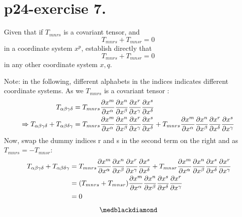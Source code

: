 \section{p24-exercise 7.}
\begin{tcolorbox}
Given that if $T_{mnrs}$ is a covariant tensor, and 
$$ T_{mnrs}+T_{mnsr} = 0$$ in a coordinate system $x^{p}$, establish directly that $$ T^{,}_{mnrs}+T^{,}_{mnsr} = 0$$ in any other coordinate system $x{,q}$.
\end{tcolorbox}
Note: in the following, different alphabets in the indices indicates different coordinate systems.
As we $T_{mnrs}$ is a covariant tensor :
\begin{align}
\ T_{\alpha\beta\gamma\delta} &=  T_{mnrs}\pdv{x^{m}}{x^{\alpha}}\pdv{x^{n}}{x^{\beta}}\pdv{x^{r}}{x^{\gamma}}\pdv{x^{s}}{x^{\delta}}\\
\Rightarrow T_{\alpha\beta\gamma\delta}+T_{\alpha\beta\delta\gamma} &= T_{mnrs}\pdv{x^{m}}{x^{\alpha}}\pdv{x^{n}}{x^{\beta}}\pdv{x^{r}}{x^{\gamma}}\pdv{x^{s}}{x^{\delta}}+ T_{mnrs}\pdv{x^{m}}{x^{\alpha}}\pdv{x^{n}}{x^{\beta}}\pdv{x^{r}}{x^{\delta}}\pdv{x^{s}}{x^{\gamma}}
\end{align}
Now, swap the dummy indices r and s in the second term on the right and as $T_{mnrs} = - T_{mnsr}$:
\begin{align}
\ T_{\alpha\beta\gamma\delta}+T_{\alpha\beta\delta\gamma} &= T_{mnrs}\pdv{x^{m}}{x^{\alpha}}\pdv{x^{n}}{x^{\beta}}\pdv{x^{r}}{x^{\gamma}}\pdv{x^{s}}{x^{\delta}}+ T_{mnsr}\pdv{x^{m}}{x^{\alpha}}\pdv{x^{n}}{x^{\beta}}\pdv{x^{s}}{x^{\delta}}\pdv{x^{r}}{x^{\gamma}}\\
&= (T_{mnrs}+ T_{mnsr})\pdv{x^{m}}{x^{\alpha}}\pdv{x^{n}}{x^{\beta}}\pdv{x^{s}}{x^{\delta}}\pdv{x^{r}}{x^{\gamma}}\\&=0
\end{align}
$$\medblackdiamond$$
\pagebreak[4]

